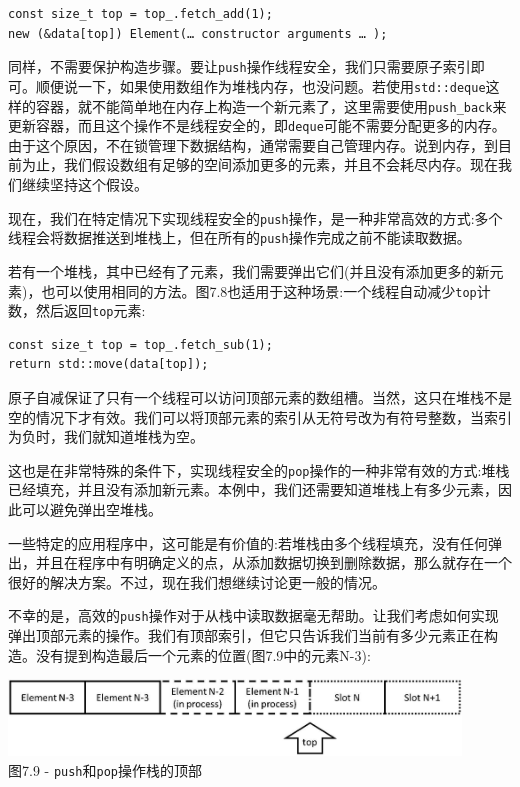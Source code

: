 \begin{lstlisting}[style=styleCXX]
const size_t top = top_.fetch_add(1);
new (&data[top]) Element(… constructor arguments … );
\end{lstlisting}

同样，不需要保护构造步骤。要让\texttt{push}操作线程安全，我们只需要原子索引即可。顺便说一下，如果使用数组作为堆栈内存，也没问题。若使用\texttt{std::deque}这样的容器，就不能简单地在内存上构造一个新元素了，这里需要使用\texttt{push\_back}来更新容器，而且这个操作不是线程安全的，即\texttt{deque}可能不需要分配更多的内存。由于这个原因，不在锁管理下数据结构，通常需要自己管理内存。说到内存，到目前为止，我们假设数组有足够的空间添加更多的元素，并且不会耗尽内存。现在我们继续坚持这个假设。

现在，我们在特定情况下实现线程安全的\texttt{push}操作，是一种非常高效的方式:多个线程会将数据推送到堆栈上，但在所有的\texttt{push}操作完成之前不能读取数据。

若有一个堆栈，其中已经有了元素，我们需要弹出它们(并且没有添加更多的新元素)，也可以使用相同的方法。图7.8也适用于这种场景:一个线程自动减少\texttt{top}计数，然后返回\texttt{top}元素:

\begin{lstlisting}[style=styleCXX]
const size_t top = top_.fetch_sub(1);
return std::move(data[top]);
\end{lstlisting}

原子自减保证了只有一个线程可以访问顶部元素的数组槽。当然，这只在堆栈不是空的情况下才有效。我们可以将顶部元素的索引从无符号改为有符号整数，当索引为负时，我们就知道堆栈为空。

这也是在非常特殊的条件下，实现线程安全的\texttt{pop}操作的一种非常有效的方式:堆栈已经填充，并且没有添加新元素。本例中，我们还需要知道堆栈上有多少元素，因此可以避免弹出空堆栈。

一些特定的应用程序中，这可能是有价值的:若堆栈由多个线程填充，没有任何弹出，并且在程序中有明确定义的点，从添加数据切换到删除数据，那么就存在一个很好的解决方案。不过，现在我们想继续讨论更一般的情况。

不幸的是，高效的\texttt{push}操作对于从栈中读取数据毫无帮助。让我们考虑如何实现弹出顶部元素的操作。我们有顶部索引，但它只告诉我们当前有多少元素正在构造。没有提到构造最后一个元素的位置(图7.9中的元素N-3):

\begin{center}
\includegraphics[width=0.9\textwidth]{content/2/chapter7/images/9.jpg}\\
图7.9 - \texttt{push}和\texttt{pop}操作栈的顶部
\end{center}

